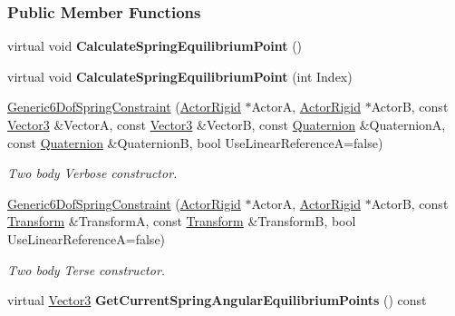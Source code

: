 \subsubsection*{Public Member Functions}
\begin{DoxyCompactItemize}
\item 
\hypertarget{classMezzanine_1_1Generic6DofSpringConstraint_a6f26a054060b9ab582b0f0d4e4e70701}{
virtual void {\bfseries CalculateSpringEquilibriumPoint} ()}
\label{classMezzanine_1_1Generic6DofSpringConstraint_a6f26a054060b9ab582b0f0d4e4e70701}

\item 
\hypertarget{classMezzanine_1_1Generic6DofSpringConstraint_a903fe80ef99b612749b62f713d122b47}{
virtual void {\bfseries CalculateSpringEquilibriumPoint} (int Index)}
\label{classMezzanine_1_1Generic6DofSpringConstraint_a903fe80ef99b612749b62f713d122b47}

\item 
\hyperlink{classMezzanine_1_1Generic6DofSpringConstraint_a5f6ae308296bba7226957301117dbe7a}{Generic6DofSpringConstraint} (\hyperlink{classMezzanine_1_1ActorRigid}{ActorRigid} $\ast$ActorA, \hyperlink{classMezzanine_1_1ActorRigid}{ActorRigid} $\ast$ActorB, const \hyperlink{classMezzanine_1_1Vector3}{Vector3} \&VectorA, const \hyperlink{classMezzanine_1_1Vector3}{Vector3} \&VectorB, const \hyperlink{classMezzanine_1_1Quaternion}{Quaternion} \&QuaternionA, const \hyperlink{classMezzanine_1_1Quaternion}{Quaternion} \&QuaternionB, bool UseLinearReferenceA=false)
\begin{DoxyCompactList}\small\item\em Two body Verbose constructor. \item\end{DoxyCompactList}\item 
\hyperlink{classMezzanine_1_1Generic6DofSpringConstraint_a5fa0596a4bc966d286bf9b21982717d1}{Generic6DofSpringConstraint} (\hyperlink{classMezzanine_1_1ActorRigid}{ActorRigid} $\ast$ActorA, \hyperlink{classMezzanine_1_1ActorRigid}{ActorRigid} $\ast$ActorB, const \hyperlink{classMezzanine_1_1Transform}{Transform} \&TransformA, const \hyperlink{classMezzanine_1_1Transform}{Transform} \&TransformB, bool UseLinearReferenceA=false)
\begin{DoxyCompactList}\small\item\em Two body Terse constructor. \item\end{DoxyCompactList}\item 
\hypertarget{classMezzanine_1_1Generic6DofSpringConstraint_acc847f95c75ee39241d1e67800c5a6f4}{
virtual \hyperlink{classMezzanine_1_1Vector3}{Vector3} {\bfseries GetCurrentSpringAngularEquilibriumPoints} () const }
\label{classMezzanine_1_1Generic6DofSpringConstraint_acc847f95c75ee39241d1e67800c5a6f4}


\end{DoxyCompactItemize}
